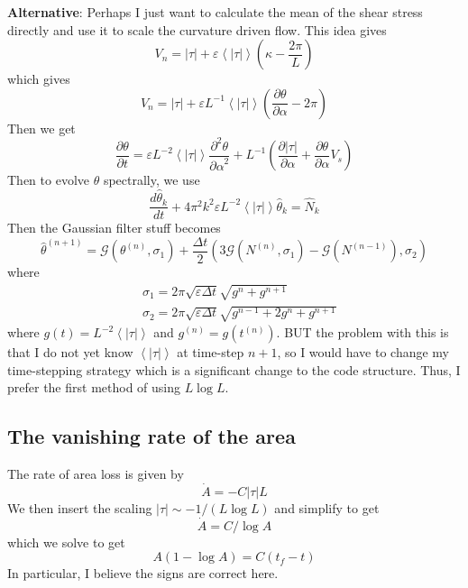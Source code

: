 \documentclass[11pt]{article}
\newcommand{\vsp}[1]{\vspace{#1 pc} \noindent}
\newcommand{\pd}[2]    { \frac{\partial #1} {\partial #2} }
\newcommand{\ppd}[2]  { \frac{\partial^2 #1}{{\partial #2}^2} }
\newcommand{\td}[2] { \frac{d #1} { d #2 } }
\newcommand{\abs}[1]{\left| #1 \right|}
\newcommand{\mean}[1]{\left< #1 \right>}
\newcommand{\eps}{\varepsilon}
\newcommand{\atau}{\abs{\tau}}
\newcommand{\thh}{\hat{\theta}}
\newcommand{\GG}{\mathcal{G}}
\newcommand{\Dt}{\Delta t}
\begin{document}
\vsp{2}
{\bf  Alternative}: Perhaps I just want to calculate the mean of the shear stress directly and use it to scale the curvature driven flow. This idea gives
\begin{equation}
V_n = \atau + \eps \mean{\atau} \left(\kappa - \frac{2 \pi}{L} \right)
\end{equation}
which gives
\begin{equation}
V_n = \atau + \eps L^{-1} \mean{\atau} \left(\pd{\theta}{\alpha} - 2 \pi \right)
\end{equation}
Then we get
\begin{equation}
\pd{\theta}{t} = \eps L^{-2} \mean{\atau} \ppd{\theta}{\alpha} + L^{-1} \left( \pd{\atau}{\alpha} + \pd{\theta}{\alpha} V_s \right)
\end{equation}
Then to evolve $\theta$ spectrally, we use
\begin{equation}
\td{\thh_k}{t} + 4 \pi^2 k^2 \eps L^{-2} \mean{\atau}  \thh_k = \hat{N}_k
\end{equation}
Then the Gaussian filter stuff becomes
\begin{equation}
\label{intfact}
\thh^{(n+1)} = \GG(\theta^{(n)}, \sigma_1) 
+ \frac{\Dt}{2} \left( 3 \GG(N^{(n)}, \sigma_1) - \GG(N^{(n-1)}), \sigma_2 \right)
\end{equation}
where
\begin{align}
& \sigma_1 = 2 \pi \sqrt{\eps \Dt} \sqrt{g^{n} + g^{n+1} } 	\\
& \sigma_2 = 2 \pi \sqrt{\eps \Dt} \sqrt{g^{n-1} + 2 g^{n} + g^{n+1} }
\end{align}
where $g(t)= L^{-2} \mean{\atau}$ and $g^{(n)} = g(t^{(n)})$.
BUT the problem with this is that I do not yet know $\mean{\atau}$ at time-step $n+1$, so I would have to change my time-stepping strategy which is a significant change to the code structure. Thus, I prefer the first method of using $L \log L$.


\subsection{The vanishing rate of the area}
The rate of area loss is given by
\begin{equation}
\dot{A} = -C \abs{\tau} L
\end{equation}
We then insert the scaling $\abs{\tau} \sim -1/(L \log L)$ and simplify to get
\begin{equation}
\dot{A} = C/\log{A}
\end{equation}
which we solve to get
\begin{equation}
A (1 - \log A) = C (t_f - t)
\end{equation}
In particular, I believe the signs are correct here.
\end{document}
